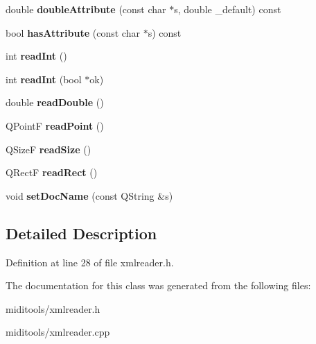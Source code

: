 \begin{DoxyCompactItemize}
\item 
\mbox{\label{class_xml_reader_a845ff7e658cf2a452eae098eda64663f}} 
double {\bfseries double\+Attribute} (const char $\ast$s, double \+\_\+default) const
\item 
\mbox{\label{class_xml_reader_a81abc42e11f1e3076f2a81a752d4c27c}} 
bool {\bfseries has\+Attribute} (const char $\ast$s) const
\item 
\mbox{\label{class_xml_reader_af2e2b036e78083f067cd669c6b1d85cf}} 
int {\bfseries read\+Int} ()
\item 
\mbox{\label{class_xml_reader_a1d4f8d1749e1476d8946cfd844745e86}} 
int {\bfseries read\+Int} (bool $\ast$ok)
\item 
\mbox{\label{class_xml_reader_a356501e2a9e89aed56e409db35f51ce1}} 
double {\bfseries read\+Double} ()
\item 
\mbox{\label{class_xml_reader_a5fd81242cc2e818bf26112bc5fafec3a}} 
Q\+PointF {\bfseries read\+Point} ()
\item 
\mbox{\label{class_xml_reader_a55f87a8fee4efbbe9bcec507b5d195f3}} 
Q\+SizeF {\bfseries read\+Size} ()
\item 
\mbox{\label{class_xml_reader_ac009a9e29f39651c5a36664a9ef0a726}} 
Q\+RectF {\bfseries read\+Rect} ()
\item 
\mbox{\label{class_xml_reader_a3a685fe5f613255946bee1fed41e6791}} 
void {\bfseries set\+Doc\+Name} (const Q\+String \&s)
\end{DoxyCompactItemize}


\subsection{Detailed Description}


Definition at line 28 of file xmlreader.\+h.



The documentation for this class was generated from the following files\+:\begin{DoxyCompactItemize}
\item 
miditools/xmlreader.\+h\item 
miditools/xmlreader.\+cpp\end{DoxyCompactItemize}
